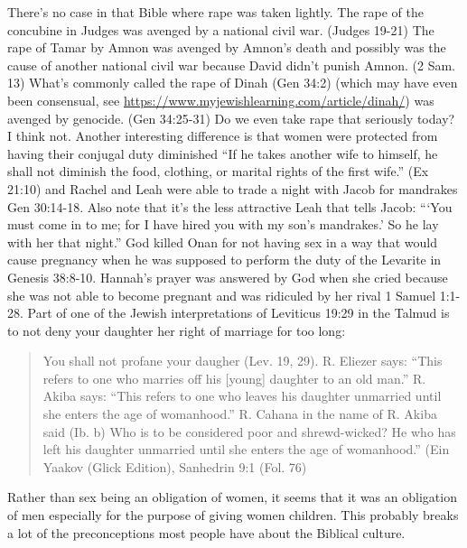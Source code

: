 \documentclass[11pt]{article}
\begin{document}
There’s no case in that Bible where rape was taken lightly. The rape of the concubine in Judges was avenged by a national civil war. (Judges 19-21) The rape of Tamar by Amnon was avenged by Amnon’s death and possibly was the cause of another national civil war because David didn’t punish Amnon. (2 Sam. 13) What’s commonly called the rape of Dinah (Gen 34:2) (which may have even been consensual, see \url{https://www.myjewishlearning.com/article/dinah/}) was avenged by genocide. (Gen 34:25-31) Do we even take rape that seriously today? I think not. Another interesting difference is that women were protected from having their conjugal duty diminished “If he takes another wife to himself, he shall not diminish the food, clothing, or marital rights of the first wife.” (Ex 21:10) and Rachel and Leah were able to trade a night with Jacob for mandrakes Gen 30:14-18. Also note that it’s the less attractive Leah that tells Jacob: “‘You must come in to me; for I have hired you with my son’s mandrakes.’ So he lay with her that night.” God killed Onan for not having sex in a way that would cause pregnancy when he was supposed to perform the duty of the Levarite in Genesis 38:8-10. Hannah’s prayer was answered by God when she cried because she was not able to become pregnant and was ridiculed by her rival 1 Samuel 1:1-28. Part of one of the Jewish interpretations of Leviticus 19:29 in the Talmud is to not deny your daughter her right of marriage for too long:

\begin{quote}
You shall not profane your daugher (Lev. 19, 29). R. Eliezer says: “This refers to one who marries off his [young] daughter to an old man.” R. Akiba says: “This refers to one who leaves his daughter unmarried until she enters the age of womanhood.” R. Cahana in the name of R. Akiba said (Ib. b) Who is to be considered poor and shrewd-wicked? He who has left his daughter unmarried until she enters the age of womanhood.”
 (Ein Yaakov (Glick Edition), Sanhedrin 9:1 (Fol. 76)
\end{quote}

Rather than sex being an obligation of women, it seems that it was an obligation of men especially for the purpose of giving women children. This probably breaks a lot of the preconceptions most people have about the Biblical culture.
\end{document}
